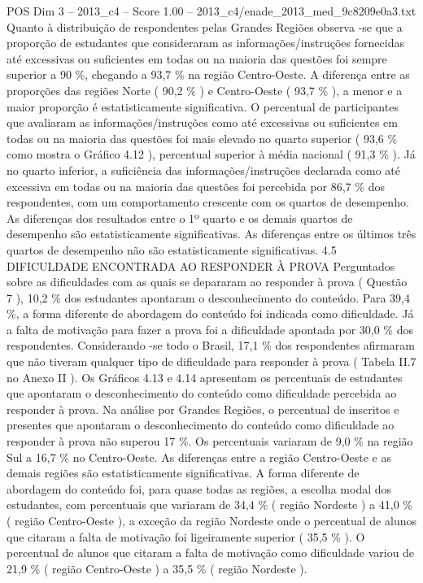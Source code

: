 \begin{textsample}{POS Dim 3 – 2013\_c4 – Score 1.00 – 2013\_c4/enade\_2013\_med\_9c8209e0a3.txt}
Quanto à distribuição de respondentes pelas Grandes Regiões observa -se que a proporção de estudantes que consideraram as informações/instruções fornecidas até excessivas ou suficientes em todas ou na maioria das questões foi sempre superior a 90 \%, chegando a 93,7 \% na região Centro-Oeste.
A diferença entre as proporções das regiões Norte ( 90,2 \% ) e Centro-Oeste ( 93,7 \% ), a menor e a maior proporção é estatisticamente significativa.
O percentual de participantes que avaliaram as informações/instruções como até excessivas ou suficientes em todas ou na maioria das questões foi mais elevado no quarto superior ( 93,6 \% como mostra o Gráfico 4.12 ), percentual superior à média nacional ( 91,3 \% ).
Já no quarto inferior, a suficiência das informações/instruções declarada como até excessiva em todas ou na maioria das questões foi percebida por 86,7 \% dos respondentes, com um comportamento crescente com os quartos de desempenho.
As diferenças dos resultados entre o 1º quarto e os demais quartos de desempenho são estatisticamente significativas.
As diferenças entre os últimos três quartos de desempenho não são estatisticamente significativas. 4.5 DIFICULDADE ENCONTRADA AO RESPONDER À PROVA Perguntados sobre as dificuldades com as quais se depararam ao responder à prova ( Questão 7 ), 10,2 \% dos estudantes apontaram o desconhecimento do conteúdo.
Para 39,4 \%, a forma diferente de abordagem do conteúdo foi indicada como dificuldade.
Já a falta de motivação para fazer a prova foi a dificuldade apontada por 30,0 \% dos respondentes.
Considerando -se todo o Brasil, 17,1 \% dos respondentes afirmaram que não tiveram qualquer tipo de dificuldade para responder à prova ( Tabela II.7 no Anexo II ).
Os Gráficos 4.13 e 4.14 apresentam os percentuais de estudantes que apontaram o desconhecimento do conteúdo como dificuldade percebida ao responder à prova.
Na análise por Grandes Regiões, o percentual de inscritos e presentes que apontaram o desconhecimento do conteúdo como dificuldade ao responder à prova não superou 17 \%.
Os percentuais variaram de 9,0 \% na região Sul a 16,7 \% no Centro-Oeste.
As diferenças entre a região Centro-Oeste e as demais regiões são estatisticamente significativas.
A forma diferente de abordagem do conteúdo foi, para quase todas as regiões, a escolha modal dos estudantes, com percentuais que variaram de 34,4 \% ( região Nordeste ) a 41,0 \% ( região Centro-Oeste ), a exceção da região Nordeste onde o percentual de alunos que citaram a falta de motivação foi ligeiramente superior ( 35,5 \% ).
O percentual de alunos que citaram a falta de motivação como dificuldade variou de 21,9 \% ( região Centro-Oeste ) a 35,5 \% ( região Nordeste ).

\end{textsample}

